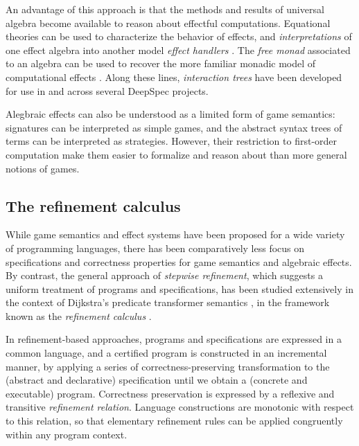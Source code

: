 \documentclass[11pt,oneside,draft]{book}
\theoremstyle{definition}
\begin{document}
An advantage of this approach is that
the methods and results of universal algebra
become available to reason about effectful computations.
Equational theories can be used to characterize
the behavior of effects, and \emph{interpretations}
of one effect algebra into another model
\emph{effect handlers} \citep{eff}.
The \emph{free monad} associated to an algebra
can be used to recover the more familiar
monadic model of computational effects \citep{monads}.
Along these lines,
\emph{interaction trees} \citep{itree}
have been developed for use in and across
several DeepSpec projects.

Alegbraic effects can also be understood as
a limited form of game semantics:
signatures can be interpreted as simple games,
and the abstract syntax trees of terms
can be interpreted as strategies.
However,
their restriction to first-order computation
make them easier to formalize and reason about
than more general notions of games.



\subsection{The refinement calculus} %

While game semantics
and effect systems
have been proposed
for a wide variety of programming languages,
there has been comparatively less focus
on specifications and correctness properties
for game semantics and algebraic effects.
By contrast,
the general approach of \emph{stepwise refinement},
which suggests a uniform treatment of programs and specifications,
has been studied extensively in the context of
Dijkstra's predicate transformer semantics \citep{gc},
in the framework known as the \emph{refinement calculus} \citep{refcal}.

In refinement-based approaches,
programs and specifications are expressed in a common language,
and a certified program is constructed in an incremental manner,
by applying a series of correctness-preserving transformation
to the (abstract and declarative) specification
until we obtain a (concrete and executable) program.
Correctness preservation is expressed
by a reflexive and transitive \emph{refinement relation}.
Language constructions are monotonic with respect to this relation,
so that elementary refinement rules
can be applied congruently within any program context.
\end{document}
